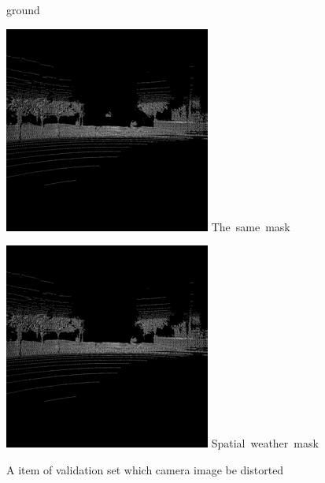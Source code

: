 \begin{figure}[!ht]
\begin{minipage}[t]{.24\linewidth}
        \hbox{ground}
    \end{minipage}
    \begin{minipage}[t]{.24\linewidth}
        \includegraphics[width=\linewidth]{imgs/base/same.png}
        \hbox{The same mask}
    \end{minipage}
    \begin{minipage}[t]{.24\linewidth}
        \includegraphics[width=\linewidth]{imgs/base/weathermasl.png}
        \hbox{Spatial weather mask}
    \end{minipage}
    \caption{A item of validation set which camera image be distorted}
    \label{img:result-camera}
\end{figure}


